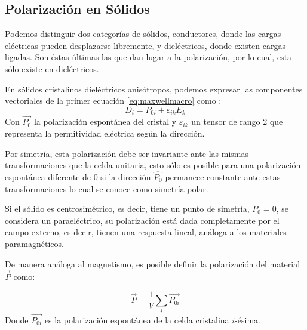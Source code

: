 \documentclass[../main.tex]{subfiles}
\begin{document}
\subsection{Polarización en Sólidos}
Podemos distinguir dos categorías de sólidos, conductores, donde las cargas eléctricas pueden desplazarse libremente, y dieléctricos, donde existen cargas ligadas. Son éstas últimas las que dan lugar a la polarización, por lo cual, esta sólo existe en dieléctricos.

En sólidos cristalinos dieléctricos anisótropos, podemos expresar las componentes vectoriales de la primer ecuación \ref{eq:maxwellmacro} como \cite{Landau1984}:
\begin{equation}
    D_i=P_{0i}+\varepsilon_{ik}E_k
    \label{eq:macroelec}
\end{equation}
Con $\vec{P_{0}}$ la polarización espontánea del cristal y $\varepsilon_{ik}$ un tensor de rango 2 que representa la permitividad eléctrica según la dirección.

Por simetría, esta polarización debe ser invariante ante las mismas transformaciones que la celda unitaria, esto sólo es posible para una polarización espontánea diferente de 0 si la dirección $\hat{P_{0}}$ permanece constante ante estas transformaciones lo cual se conoce como simetría polar.

Si el sólido es centrosimétrico, es decir, tiene un punto de simetría, $P_0=0$, se considera un paraeléctrico, su polarización está dada completamente por el campo externo, es decir, tienen una respuesta lineal, análoga a los materiales paramagnéticos.

De manera análoga al magnetismo, es posible definir la polarización del material $\vec{P}$ como:

\begin{equation}
    \vec{P}=\dfrac{1}{V}\sum_{i}\vec{P_{0i}}
    \label{eq:polarizacionmicromacro}
\end{equation}
Donde $\vec{P_{0i}}$ es la polarización espontánea de la celda cristalina $i$-ésima.
\end{document}

